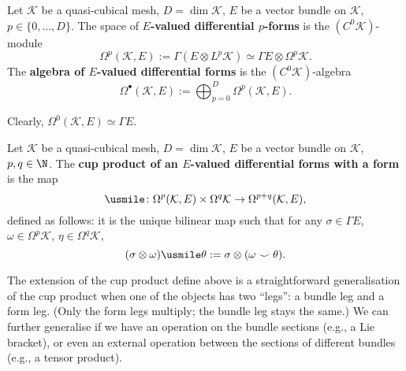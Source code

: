 \begin{definition}
  Let
    $\mathcal{K}$ be a quasi-cubical mesh,
    $D = \dim \mathcal{K}$,
    $E$ be a vector bundle on $\mathcal{K}$,
    $p \in \{0, ..., D\}$.
  The space of \textbf{$E$-valued differential $p$-forms} is the
  $(C^0 \mathcal{K})$-module
  \begin{equation}
    \Omega^{p}(\mathcal{K}, E)
    := \Gamma(E \otimes L^p \mathcal{K})
    \simeq \Gamma E \otimes \Omega^p \mathcal{K}.
  \end{equation}
  The \textbf{algebra of $E$-valued differential forms} is the
  $(C^0 \mathcal{K})$-algebra
  \begin{equation}
    \Omega^\bullet(\mathcal{K}, E)
    := \bigoplus_{p = 0}^D \Omega^p(\mathcal{K}, E).
  \end{equation}
\end{definition}
\begin{remark}
  Clearly, $\Omega^{0}(\mathcal{K}, E) \simeq \Gamma E$.
\end{remark}
\begin{definition}
  Let
    $\mathcal{K}$ be a quasi-cubical mesh,
    $D = \dim \mathcal{K}$,
    $E$ be a vector bundle on $\mathcal{K}$,
    $p, q \in \N$.
  The \textbf{cup product of an $E$-valued differential forms with a form}
  is the map
  \begin{equation}
    \usmile
    \colon \Omega^p(\mathcal{K}, E) \times \Omega^q \mathcal{K}
    \to \Omega^{p + q}(\mathcal{K}, E),
  \end{equation}
  defined as follows: it is the unique bilinear map such that for any
  $\sigma \in \Gamma E$,
  $\omega \in \Omega^p \mathcal{K}$,
  $\eta \in \Omega^q \mathcal{K}$,
  \begin{equation}
    (\sigma \otimes \omega) \usmile \theta :=
    \sigma \otimes (\omega \smile \theta).
  \end{equation}
\end{definition}
\begin{remark}
  The extension of the cup product define above is a straightforward
  generalisation of the cup product when one of the objects has two ``legs'':
  a bundle leg and a form leg.
  (Only the form legs multiply; the bundle leg stays the same.)
  We can further generalise if we have an operation on the bundle sections
  (e.g., a Lie bracket),
  or even an external operation between the sections of different bundles
  (e.g., a tensor product). 
\end{remark}
